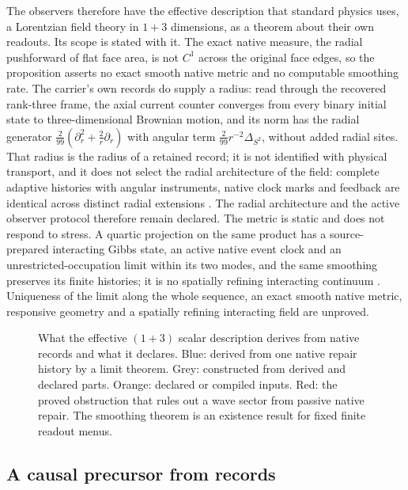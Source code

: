 \documentclass[11pt]{article}
\theoremstyle{definition}
\theoremstyle{remark}
\begin{document}
The observers therefore have the effective description that standard physics
uses, a Lorentzian field theory in $1+3$ dimensions, as a theorem about their
own readouts. Its scope is stated with it. The exact native measure, the
radial pushforward of flat face area, is not $C^1$ across the original face
edges, so the proposition asserts no exact smooth native metric and no
computable smoothing rate. The carrier's own records do supply a radius:
read through the recovered rank-three frame, the axial current counter
converges from every binary initial state to three-dimensional Brownian
motion, and its norm has the radial generator
$\tfrac{2}{99}(\partial_r^2+\tfrac2r\partial_r)$ with angular term
$\tfrac{2}{99}r^{-2}\Delta_{S^2}$, without added radial sites. That radius
is the radius of a retained record; it is not identified with physical
transport, and it does not select the radial architecture of the field: complete adaptive histories
with angular instruments, native clock marks and feedback are identical
across distinct radial extensions \cite{ophspine}. The radial architecture
and the active observer protocol therefore remain declared. The metric is
static and does not respond to stress. A quartic projection on the same
product has a source-prepared interacting Gibbs state, an active native event
clock and an unrestricted-occupation limit within its two modes, and the
same smoothing preserves its finite histories; it is no spatially refining
interacting continuum \cite{ophspine}. Uniqueness of the limit along the
whole sequence, an exact smooth native metric, responsive geometry and a
spatially refining interacting field are unproved.

\begin{figure}[!htb]
\centering

\caption{What the effective $(1+3)$ scalar description derives from native records and what it declares. Blue: derived from one native repair history by a limit theorem. Grey: constructed from derived and declared parts. Orange: declared or compiled inputs. Red: the proved obstruction that rules out a wave sector from passive native repair. The smoothing theorem is an existence result for fixed finite readout menus.}
\label{fig:field-chain}
\end{figure}

\subsection{A causal precursor from records}
\label{sec:spacetime}
\end{document}
